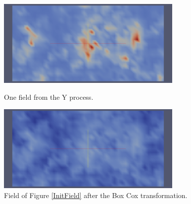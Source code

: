 \begin{figure}[H]
  \begin{minipage}{9cm}
    \begin{center}
      \includegraphics[width=9cm]{Figures/BoxCoxInitField.pdf}
      \caption{One field from the Y process.}
      \label{InitField}
    \end{center}
  \end{minipage}
  \hfill
  \begin{minipage}{9cm}
    \begin{center}
      \includegraphics[width=9cm]{Figures/BoxCoxStabilizedField.pdf}
      \caption{Field of Figure \ref{InitField} after the Box Cox transformation.}
      \label{StabField}
    \end{center}
  \end{minipage}
\end{figure}
